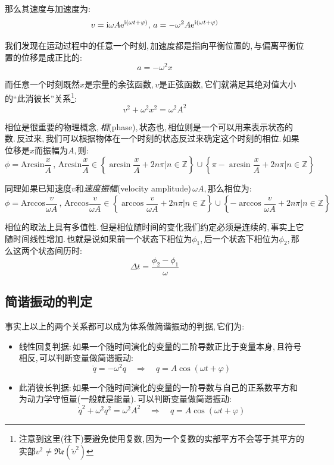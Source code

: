 那么其速度与加速度为:
\[v={\rm i}\omega A{\rm e}^{{\rm i}(\omega t+\varphi)},\,a=-\omega^2A{\rm e}^{{\rm i}(\omega t+\varphi)}\]

我们发现在运动过程中的任意一个时刻,\,加速度都是指向平衡位置的,\,与偏离平衡位置的位移是成正比的:
\[a=-\omega^2 x\]

而任意一个时刻既然$x$是宗量的余弦函数,\,$v$是正弦函数,\,它们就满足其绝对值大小的``此消彼长''关系\footnote{注意到这里(往下)要避免使用复数,\,因为一个复数的实部平方不会等于其平方的实部$v^2\neq\mathfrak{Re}(\tilde{v}^2)$}:
\[v^2+\omega^2 x^2=\omega^2 A^2\]

相位是很重要的物理概念,\,\emph{相}(phase),\,状态也,\,相位则是一个可以用来表示状态的数.\,反过来,\,我们可以根据物体在一个时刻的状态反过来确定这个时刻的相位.\,如果位移是$x$而振幅为$A$,\,则:
\[\phi=\mathrm{Arcsin}\frac{x}{A}\, ,\,\mathrm{Arcsin}\frac{x}{A}\in \left\{\arcsin\frac{x}{A}+2n\pi|n\in\mathbb{Z}\right\}\cup\left\{\pi-\arcsin\frac{x}{A}+2n\pi|n\in\mathbb{Z}\right\}\]

同理如果已知速度$v$和\emph{速度振幅}(velocity amplitude)\,$\omega A$,\,那么相位为:
\[\phi=\mathrm{Arccos}\frac{v}{\omega A}\, ,\,\mathrm{Arccos}\frac{v}{\omega A}\in \left\{\arccos\frac{v}{\omega A}+2n\pi|n\in\mathbb{Z}\right\}\cup\left\{-\arccos\frac{v}{\omega A}+2n\pi|n\in\mathbb{Z}\right\}\]

相位的取法上具有多值性.\,但是相位随时间的变化我们约定必须是连续的,\,事实上它随时间线性增加.\,也就是说如果前一个状态下相位为$\phi_1$,\,后一个状态下相位为$\phi_2$,\,那么这两个状态间历时:
\[\Delta t=\frac{\phi_2-\phi_1}{\omega}\]

\subsection{简谐振动的判定}

事实上以上的两个关系都可以成为体系做简谐振动的判据,\,它们为:

\begin{itemize}
	\item 线性回复判据:\,如果一个随时间演化的变量的二阶导数正比于变量本身,\,且符号相反,\,可以判断变量做简谐振动:
	\[\ddot{q}=-\omega^2 q\quad \Rightarrow \quad q=A\cos(\omega t+\varphi)\]

	\item 此消彼长判据:\,如果一个随时间演化的变量的一阶导数与自己的正系数平方和为动力学守恒量(一般就是能量).\,可以判断变量做简谐振动:
	\[\dot{q}^2+\omega^2 q^2=\omega^2A^2\quad \Rightarrow \quad q=A\cos(\omega t+\varphi)\]
\end{itemize}

